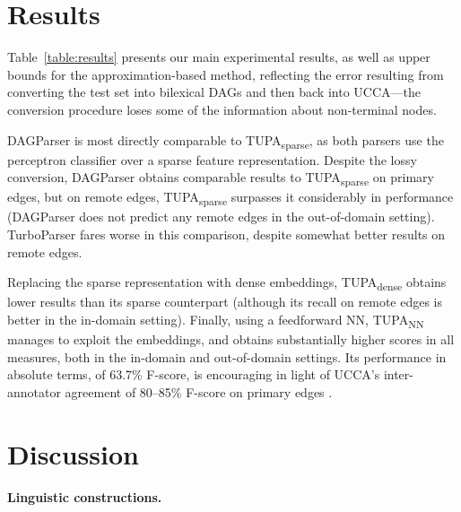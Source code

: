 \documentclass[11pt,a4paper]{article}
\newcommand{\parser}[1]{TUPA\textsubscript{#1}}
\newcommand{\tabref}[1]{Table~\ref{#1}}
\begin{document}
\section{Results}\label{sec:results}

\tabref{table:results} presents our main experimental results, as well as
upper bounds for the approximation-based method,
reflecting the error resulting from converting the test set into bilexical DAGs and then
back into UCCA---the conversion procedure loses some of the information about non-terminal nodes.

DAGParser is most directly comparable to \parser{sparse}, as both parsers
use the perceptron classifier over a sparse feature representation.
Despite the lossy conversion, DAGParser obtains comparable results to
\parser{sparse} on primary edges, but on remote edges, \parser{sparse}
surpasses it considerably in performance
(DAGParser does not predict any remote edges in the out-of-domain setting).
TurboParser fares worse in this comparison, despite somewhat better results on
remote edges.


Replacing the sparse representation with dense embeddings, \parser{dense} obtains
lower results than its sparse counterpart (although its recall on remote edges is
better in the in-domain setting).
Finally, using a feedforward NN, \parser{NN} manages to exploit the embeddings,
and obtains substantially higher scores in all measures, both
in the in-domain and out-of-domain settings.
Its performance in absolute terms, of 63.7\% F-score, is encouraging in light of
UCCA's inter-annotator agreement of 80--85\%
F-score on primary edges \cite{abend2013universal}.



\section{Discussion}\label{sec:discussion}

\paragraph{Linguistic constructions.}
\end{document}
